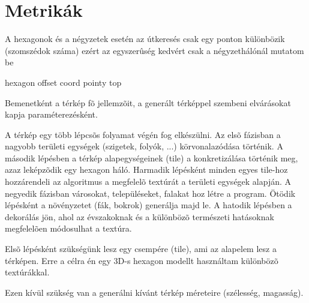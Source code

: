 
\section{Metrikák}

A hexagonok és a négyzetek esetén az útkeresés csak egy ponton különbözik (szomszédok száma) ezért az egyszerûség kedvért csak a négyzethálónál mutatom be

hexagon
offset coord
pointy top

Bemenetként a térkép fõ jellemzõit, a generált térképpel szembeni elvárásokat kapja paraméterezésként.

A térkép egy több lépcsõs folyamat végén fog elkészülni. 
Az elsõ fázisban a nagyobb területi egységek (szigetek, folyók, ...) körvonalazódása történik. 
A második lépésben a térkép alapegységeinek (tile) a konkretizálása történik meg, azaz leképzõdik egy hexagon háló. 
Harmadik lépésként minden egyes tile-hoz hozzárendeli az algoritmus a megfelelõ textúrát a területi egységek alapján. 
A negyedik fázisban városokat, településeket, falakat hoz létre a program. 
Ötödik lépésként a növényzetet (fák, bokrok) generálja majd le. 
A hatodik lépésben a dekorálás jön, ahol az évszakoknak és a különbözõ természeti hatásoknak megfelelõen módosulhat a textúra.

Elsõ lépésként szükségünk lesz egy csempére (tile), ami az alapelem lesz a térképen. Erre a célra én egy 3D-s hexagon modellt használtam különbözõ textúrákkal.

Ezen kívül szükség van a generálni kívánt térkép méreteire (szélesség, magasság).

